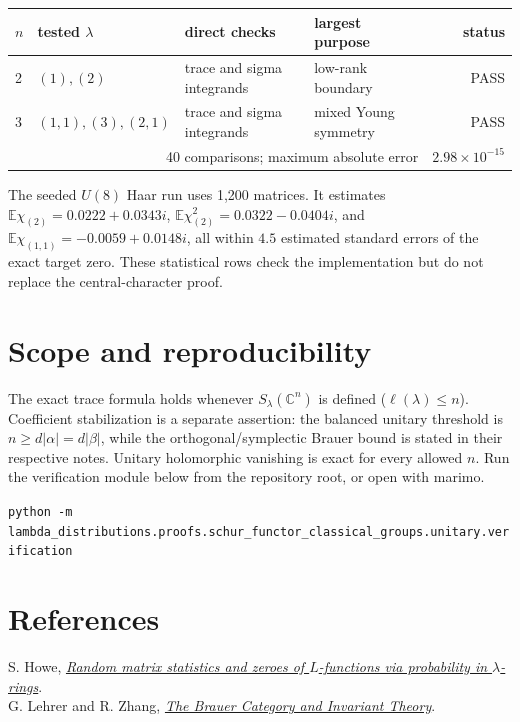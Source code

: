 \documentclass[11pt]{article}
\begin{document}
\begin{center}\begin{tabular}{@{}llllr@{}}\toprule
$n$ & tested $\lambda$ & direct checks & largest purpose & status\\\midrule
2 & $(1),(2)$ & trace and sigma integrands & low-rank boundary & PASS\\
3 & $(1,1),(3),(2,1)$ & trace and sigma integrands & mixed Young symmetry & PASS\\\midrule
\multicolumn{4}{r}{40 comparisons; maximum absolute error} & $2.98\times10^{-15}$\\\bottomrule
\end{tabular}\end{center}

\clearpage
The seeded $U(8)$ Haar run uses 1,200 matrices. It estimates $\mathbb E\chi_{(2)}=0.0222+0.0343i$, $\mathbb E\chi_{(2)}^2=0.0322-0.0404i$, and $\mathbb E\chi_{(1,1)}=-0.0059+0.0148i$, all within $4.5$ estimated standard errors of the exact target zero. These statistical rows check the implementation but do not replace the central-character proof.

\section{Scope and reproducibility}
The exact trace formula holds whenever $S_\lambda(\mathbb C^n)$ is defined ($\ell(\lambda)\le n$). Coefficient stabilization is a separate assertion: the balanced unitary threshold is $n\geq d|\alpha|=d|\beta|$, while the orthogonal/symplectic Brauer bound is stated in their respective notes.  Unitary holomorphic vanishing is exact for every allowed $n$. Run the verification module below from the repository root, or open  with marimo.
\begin{center}\footnotesize\texttt{python -m lambda\_distributions.proofs.schur\_functor\_classical\_groups.unitary.verification}\end{center}

\section*{References}
S. Howe, \href{https://arxiv.org/abs/2412.19295}{\emph{Random matrix statistics and zeroes of $L$-functions via probability in $\lambda$-rings}}.\\
G. Lehrer and R. Zhang, \href{https://arxiv.org/abs/1207.5889}{\emph{The Brauer Category and Invariant Theory}}.
\end{document}
